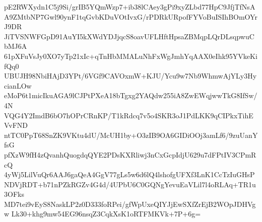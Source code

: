 pE2RWXydn1C5j9Si/grIB5YQmWzp7+ib38lCAey3gPi9xyZLbd77HpC9JfjTfNsA
A9ZMtbNP7Gwl90ynF1tqGvbKDuVOtIvxG/rPDRkURpofFYVoBuISIhBOmOYrJ9DR
JiTVSNWFGpD91AuYI5kXWdYDJjqcS8oavUFLHftHpsaZBMqpLQrDLsqpwuCbMJ6A
61pXFuVsJy0XO7yTp21xIc+qTnHbMMALuNhFxWgJmhYqAAX0eIhk95YVkeKifQq0
UBUJH98NbiHAjD3YPt/6VGf9CAVOxmW+KJU/Ycu9w7Nb9WhmwAjYLy3HycianLOw
eMoP6t1micIkuAGA9lCJPtPXeA18bTgxg2YAQdw255iA8ZwEWqjwwTkG8IfSw/4N
VQG4Y2ImdB6bO7hOPrCRnKP/T1kRdcq7v5o4SKR3oJ1PdLKK9qCIPkxTihEVvFND
ntTC0PpT68SnZK9VKtu4dU/McUH1by+O3zIB9OA6GIDiOOj3amLf6/9zuUanYfsG
pfXzW9fH4zQvanhQuogdqQYE2PDsKXRliwj3nCxGcpIdjU629u7dFPtIV3CPmRcQ
4yWj5LilVuQr6AAJ6gaQeA4GgV77gLs5w6d6lQ4lshofgUFXf3LnK1CcTzIuGHsP
NDVjRDT+b71nPZkRGZv4G4d/4UPbU6C0GQNgYevuEaVLil7l4oRLAq+TR1u3OFks
MD7tei9vEyS8NaskLP2z0D333foRPei/gfWpUxeQIYJjEwSXfZrEjB2WOpJDHVgw
Lk30+khg9mw54EG96nsqZ3CqkXsK1oRTFMKVk+7P+6g=

